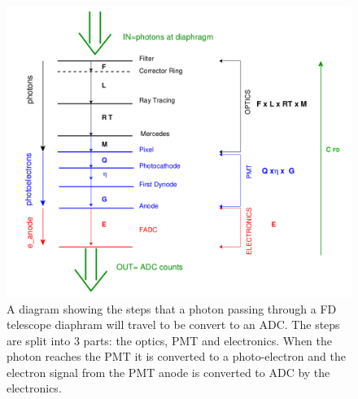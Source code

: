\begin{figure}
\centering
\includegraphics[width=\textwidth]{chapters/pix/SelEff/Layout_Coefficients_PhotonsToADC.png}
\caption{A diagram showing the steps that a photon passing through a FD telescope diaphram will travel to be convert to an ADC. The steps are split into 3 parts: the optics, PMT and electronics. When the photon reaches the PMT it is converted to a photo-electron and the electron signal from the PMT anode is converted to ADC by the electronics.} \label{fig:FD_CoefficientLayout_PhotonToADC}
\end{figure}
  
